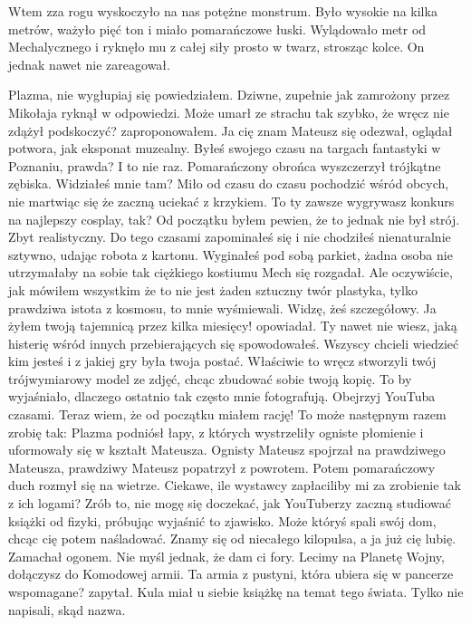 Wtem zza rogu wyskoczyło na nas potężne monstrum.
Było wysokie na kilka metrów, ważyło pięć ton i miało pomarańczowe łuski.
Wylądowało metr od Mechalycznego i ryknęło mu z całej siły prosto w twarz, strosząc kolce.
On jednak nawet nie zareagował.
\begin{dialogue}
\ds{} Plazma, nie wygłupiaj się \dm{} powiedziałem.
\ds{} Dziwne, zupełnie jak zamrożony przez Mikołaja \dm{} ryknął w odpowiedzi.
\ds{} Może umarł ze strachu tak szybko, że wręcz nie zdążył podskoczyć? \dm{} zaproponowałem.
\ds{} Ja cię znam \dm{} Mateusz się odezwał, oglądał potwora, jak eksponat muzealny. \dm{} Byłeś swojego czasu na targach fantastyki w Poznaniu, prawda?
\ds{} I to nie raz. \dm{} Pomarańczony obrońca wyszczerzył trójkątne zębiska. \dm{} Widziałeś mnie tam? Miło od czasu do czasu pochodzić wśród obcych, nie martwiąc się że zaczną uciekać z krzykiem.
\ds{} To ty zawsze wygrywasz konkurs na najlepszy cosplay, tak? Od początku byłem pewien, że to jednak nie był strój. Zbyt realistyczny.
Do tego czasami zapominałeś się i nie chodziłeś nienaturalnie sztywno, udając robota z kartonu. 
Wyginałeś pod sobą parkiet, żadna osoba nie utrzymałaby na sobie tak ciężkiego kostiumu \dm{} Mech się rozgadał. \dm{} 
Ale oczywiście, jak mówiłem wszystkim że to nie jest żaden sztuczny twór plastyka, tylko prawdziwa istota z kosmosu, to mnie wyśmiewali. 
\ds{} Widzę, żeś szczegółowy.
\ds{} Ja żyłem twoją tajemnicą przez kilka miesięcy! \dm{} opowiadał. \dm{} Ty nawet nie wiesz, jaką histerię wśród innych przebierających się spowodowałeś. 
Wszyscy chcieli wiedzieć kim jesteś i z jakiej gry była twoja postać. 
Właściwie to wręcz stworzyli twój trójwymiarowy model ze zdjęć, chcąc zbudować sobie twoją kopię.
\ds{} To by wyjaśniało, dlaczego ostatnio tak często mnie fotografują.
\ds{} Obejrzyj YouTuba czasami. Teraz wiem, że od początku miałem rację!
\ds{} To może następnym razem zrobię tak: \dm{} Plazma podniósł łapy, z których wystrzeliły ogniste płomienie i uformowały się w kształt Mateusza. 
Ognisty Mateusz spojrzał na prawdziwego Mateusza, prawdziwy Mateusz popatrzył z powrotem. Potem pomarańczowy duch rozmył się na wietrze. \dm{} 
Ciekawe, ile wystawcy zapłaciliby mi za zrobienie tak z ich logami?
\ds{} Zrób to, nie mogę się doczekać, jak YouTuberzy zaczną studiować książki od fizyki, próbując wyjaśnić to zjawisko. Może któryś spali swój dom, chcąc cię potem naśladować.
\ds{} Znamy się od niecałego kilopulsa, a ja już cię lubię. \dm{} Zamachał ogonem. \dm{} Nie myśl jednak, że dam ci fory. Lecimy na Planetę Wojny, dołączysz do Komodowej armii.
\ds{} Ta armia z pustyni, która ubiera się w pancerze wspomagane? \dm{} zapytał. \dm{} Kula miał u siebie książkę na temat tego świata. Tylko nie napisali, skąd nazwa.

\end{dialogue}
